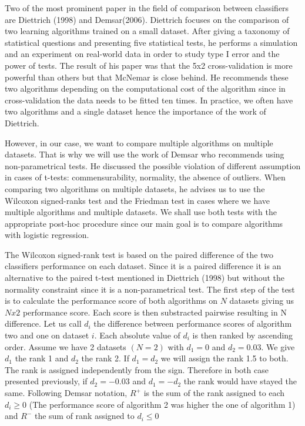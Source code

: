 \documentclass[a4paper,12pt]{article}
\numberwithin{equation}{section}
\begin{document}
Two of the most prominent paper in the field of comparison between classifiers are Diettrich (1998) and Demsar(2006). Diettrich focuses on the comparison of two learning algorithms trained on a small dataset. After giving a taxonomy of statistical questions and presenting five statistical tests, he performs a simulation and an experiment on real-world data in order to study type I error and the power of tests. The result of his paper was that the 5x2 cross-validation is more powerful than others but that McNemar is close behind. He recommends these two algorithms depending on the computational cost of the algorithm since in cross-validation the data needs to be fitted ten times. In practice, we often have two algorithms and a single dataset hence the importance of the work of Diettrich. \par
However, in our case, we want to compare multiple algorithms on multiple datasets. That is why we will use the work of Demsar who recommends using non-parametrical tests. He discussed the possible violation of different assumption in cases of t-tests: commensurability, normality, the absence of outliers. When comparing two algorithms on multiple datasets, he advises us to use the Wilcoxon signed-ranks test and the Friedman test in cases where we have multiple algorithms and multiple datasets. We shall use both tests with the appropriate post-hoc procedure since our main goal is to compare algorithms with logistic regression.  \par
The Wilcoxon signed-rank test is based on the paired difference of the two classifiers performance on each dataset. Since it is a paired difference it is an alternative to the paired t-test mentioned in Diettrich (1998) but without the normality constraint since it is a non-parametrical test. The first step of the test is to calculate the performance score of both algorithms on $N$ datasets giving us $Nx2$ performance score. Each score is then substracted pairwise resulting in N difference. Let us call $d_i$ the difference between performance scores of algorithm two and one on dataset $i$. Each absolute value of $d_i$ is then ranked by ascending order. Assume we have 2 datasets $(N=2)$ with $d_1 = 0$ and $d_2 = 0.03$. We give $d_1$ the rank 1 and $d_2$ the rank 2. If $d_1=d_2$ we will assign the rank 1.5 to both. The rank is assigned independently from the sign. Therefore in both case presented previously, if $d_2 = -0.03$ and $d_1=-d_2$  the rank would have stayed the same. Following Demsar notation, $R^+$ is the sum of the rank assigned to each $d_i \geq 0$ (The performance score of algorithm 2 was higher the one of algorithm 1) and $R^-$ the sum of rank assigned to $d_i \leq 0$
\end{document}
